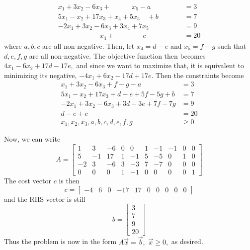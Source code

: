 \documentclass{article}
\begin{document}
\begin{itemize}
\begin{enumerate}[a)]
\begin{soln}
				\begin{align*}
					x_1+3x_2-6x_3+\quad\quad\quad x_5 - a \quad\quad\quad\quad&= 3 \\
					5x_1-x_2+17x_3+x_4+5x_5\quad+ b \quad\quad&= 7 \\
					-2x_1+3x_2-6x_3+3x_4+7x_5\quad\quad \quad\quad&= 9 \\
					\quad\quad\quad\quad\quad\quad x_4 + \quad\quad\quad\quad  c &= 20
				\end{align*} where $a, b, c$ are all non-negative. Then, let $x_4 = d - e$ and $x_5=f - g$ such that $d, e, f, g$ are all non-negative. The objective function then becomes $4x_1-6x_2+17d-17e,$ and since we want to maximize that, it is equivalent to minimizing its negative, $-4x_1+6x_2-17d+17e.$ Then the constraints become 
				\begin{align*}
					x_1+3x_2-6x_3+f - g - a &= 3 \\
					5x_1-x_2+17x_3+d-e+5f-5g+b &= 7 \\
					-2x_1+3x_2-6x_3+3d-3e+7f-7g &= 9 \\
					d - e + c &= 20 \\
					x_1, x_2, x_3, a, b, c, d, e, f, g &\ge 0
				\end{align*} 

				Now, we can write \[A=\begin{bmatrix}
						1 & 3 & -6 & 0 & 0 & 1 & -1 & -1 & 0 & 0 \\
						5 & -1 & 17 & 1 & -1 & 5 & -5 & 0 & 1 & 0 \\
						-2 & 3 & -6 & 3 & -3 & 7 & -7 & 0 & 0 & 0 \\
						0 & 0 & 0 & 1 & -1 & 0 & 0 & 0 & 0 & 1
				\end{bmatrix} \] The cost vector $c$ is then \[c =\begin{bmatrix}
					-4 & 6 & 0 & -17 & 17 & 0 & 0 & 0 & 0 & 0
			\end{bmatrix}\] and the RHS vector is still \[b=\begin{bmatrix}
				3 \\ 7 \\ 9 \\ 20 \end{bmatrix}\] Thus the problem is now in the form $A\vec{x}=\vec{b},$ $\vec{x}\ge 0,$ as desired.

			\end{soln}


\end{enumerate}
\end{itemize}
\end{document}
